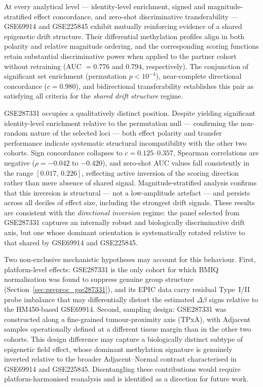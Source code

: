 At every analytical level — identity-level enrichment, signed and
magnitude-stratified effect concordance, and zero-shot discriminative
transferability — GSE69914 and GSE225845 exhibit mutually reinforcing
evidence of a shared epigenetic drift structure.
Their differential methylation profiles align in both polarity and
relative magnitude ordering, and the corresponding scoring functions
retain substantial discriminative power when applied to the partner
cohort without retraining (AUC $= 0.776$ and $0.794$, respectively).
The conjunction of significant set enrichment (permutation $p < 10^{-4}$),
near-complete directional concordance ($c = 0.980$), and bidirectional
transferability establishes this pair as satisfying all criteria for the
\emph{shared drift structure} regime.

GSE287331 occupies a qualitatively distinct position.
Despite yielding significant identity-level enrichment relative to the
permutation null — confirming the non-random nature of the selected
loci — both effect polarity and transfer performance indicate systematic
structural incompatibility with the other two cohorts.
Sign concordance collapses to $c = 0.125$--$0.357$, Spearman
correlations are negative ($\rho = -0.042$ to $-0.420$),
and zero-shot AUC values fall consistently in the range
$[0.017,\, 0.226]$, reflecting active inversion of the scoring
direction rather than mere absence of shared signal.
Magnitude-stratified analysis confirms that this inversion is
structural — not a low-amplitude artefact — and persists across
all deciles of effect size, including the strongest drift signals.
These results are consistent with the \emph{directional inversion}
regime: the panel selected from GSE287331 captures an internally
robust and biologically discriminative drift axis, but one whose
dominant orientation is systematically rotated relative to that
shared by GSE69914 and GSE225845.

Two non-exclusive mechanistic hypotheses may account for this behaviour.
First, platform-level effects: GSE287331 is the only cohort for which
BMIQ normalisation was found to suppress genuine group structure
(Section~\ref{sec:preproc_gse287331}), and its EPIC data carry
residual Type~I/II probe imbalance that may differentially distort
the estimated $\Delta\beta$ signs relative to the HM450-based
GSE69914.
Second, sampling design: GSE287331 was constructed along a
fine-grained tumour-proximity axis (TPxA), with Adjacent samples
operationally defined at a different tissue margin than in the other
two cohorts.
This design difference may capture a biologically distinct subtype of
epigenetic field effect, whose dominant methylation signature is
genuinely inverted relative to the broader Adjacent--Normal contrast
characterised in GSE69914 and GSE225845.
Disentangling these contributions would require platform-harmonised
reanalysis and is identified as a direction for future work.


